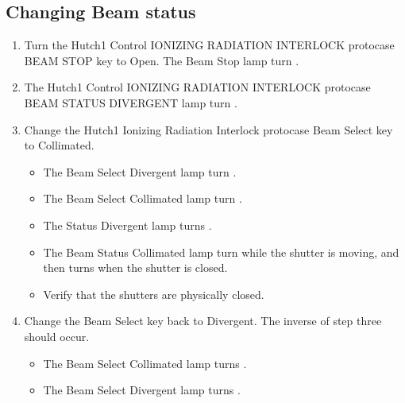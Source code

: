 \documentclass[letterpaper,10pt,english]{sphinxmanual}
\begin{document}
\subsection{Changing Beam status}
\label{\detokenize{testing_documentation/Hutch-1_ionizing_radiation:changing-beam-status}}\begin{enumerate}
%
\item {} 
\sphinxAtStartPar
Turn the Hutch\sphinxhyphen{}1 Control IONIZING RADIATION INTERLOCK protocase BEAM STOP key to Open.
The Beam Stop lamp turn .

\item {} 
\sphinxAtStartPar
The Hutch\sphinxhyphen{}1 Control IONIZING RADIATION INTERLOCK protocase BEAM STATUS DIVERGENT lamp turn .

\item {} 
\sphinxAtStartPar
Change the Hutch\sphinxhyphen{}1 Ionizing Radiation Interlock protocase Beam Select key to Collimated.
\begin{itemize}
\item {} 
\sphinxAtStartPar
The Beam Select Divergent lamp turn .

\item {} 
\sphinxAtStartPar
The Beam Select Collimated lamp turn .

\item {} 
\sphinxAtStartPar
The Status Divergent lamp turns .

\item {} 
\sphinxAtStartPar
The Beam Status Collimated lamp turn  while the shutter is moving, and then turns  when the shutter is closed.

\item {} 
\sphinxAtStartPar
Verify that the shutters are physically closed.

\end{itemize}

\item {} 
\sphinxAtStartPar
Change the Beam Select key back to Divergent. The inverse of step three should occur.
\begin{itemize}
\item {} 
\sphinxAtStartPar
The Beam Select Collimated lamp turns .

\item {} 
\sphinxAtStartPar
The Beam Select Divergent lamp turns .


\end{itemize}
\end{enumerate}
\end{document}
